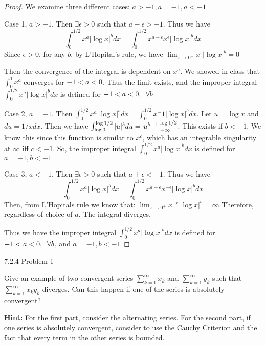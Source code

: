\documentclass[11pt]{article}
\begin{document}
\begin{proof}
    We examine three different cases: $a > -1, a = -1, a < -1$

    Case 1, $a > -1$. Then $\exists \epsilon > 0$ such that $a - \epsilon > -1$. 
    Thus we have $$\int_0 ^{1/2} x^a | \log x|^b dx = \int_0 ^{1/2} x^{a - \epsilon} x^\epsilon | \log x|^b dx$$
    Since $\epsilon > 0$, for any $b$, by L'Hopital's rule, we have $\lim_{x \to 0^+} x^\epsilon |\log x|^b = 0$
    
    Then the convergence of the integral is dependent on $x^a$. We showed in class that $\int_0 ^1 x^a$ converges for $-1 < a < 0$.
    Thus the limit exists, and the improper integral $\int_0 ^{1/2} x^a | \log x|^b dx$ is defined for $-1 < a < 0, \sp \forall b$


    Case 2, $a = -1$. Then $\int_0 ^{1/2} x^a | \log x|^b dx = \int_0 ^{1/2} x^-1 | \log x|^b dx$. Let $u = \log x$ and $du = 1/x dx$.
    Then we have $\int_{\log 0} ^{\log 1/2} |u|^b du = \Eval{u ^{b+1}}{-\infty}{\log 1/2}$. This exists if $b < -1$.
    We know this since this function is similar to $x^c$, which has an integrable singularity at $\infty$ iff $c < -1$.
    So, the improper integral $\int_0 ^{1/2} x^a | \log x|^b dx$ is defined for $a = -1, b < -1$

    Case 3, $a < -1$. Then $\exists \epsilon > 0$ such that $a + \epsilon < -1$.  Thus we have
    $$\int_0 ^{1/2} x^a | \log x|^b dx = \int_0 ^{1/2} x^{a + \epsilon} x^{-\epsilon} | \log x|^b dx$$
    Then, from L'Hopitals rule we know that: $\lim_{x \to 0^+} x^{-\epsilon} |\log x|^b = \infty$
    Therefore, regardless of choice of $a$. The integral diverges.

    Thus we have the improper integral $\int_0 ^{1/2} x^a | \log x|^b dx$ is defined for $-1 < a < 0, \sp \forall b$, and $a = -1, b < -1$

\end{proof}



 7.2.4 Problem 1

Give an example of two convergent series $\sum_{k = 1} ^\infty x_k$ and $\sum_{k = 1} ^\infty y_k$
such that $\sum_{k = 1} ^\infty x_k y_k$ diverges. Can this happen if one of the series is absolutely convergent?

\textbf{Hint:} For the first part, consider the alternating series. 
For the second part, if one series is absolutely convergent, consider to use the Cauchy Criterion and the fact
that every term in the other series is bounded.
\end{document}
